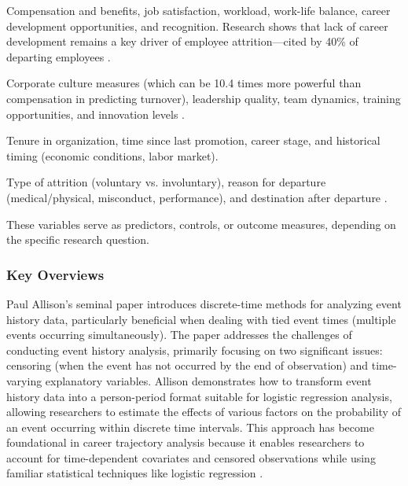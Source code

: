 \documentclass[../main.tex]{subfiles}
\begin{document}
Compensation and benefits, job satisfaction, workload, work-life balance, career development opportunities, and recognition. Research shows that lack of career development remains a key driver of employee attrition—cited by 40\% of departing employees \citep{gartner2023career}.

Corporate culture measures (which can be 10.4 times more powerful than compensation in predicting turnover), leadership quality, team dynamics, training opportunities, and innovation levels \citep{sull2022toxic}.

Tenure in organization, time since last promotion, career stage, and historical timing (economic conditions, labor market).

Type of attrition (voluntary vs. involuntary), reason for departure (medical/physical, misconduct, performance), and destination after departure \citep{niessen2016attrition}.

These variables serve as predictors, controls, or outcome measures, depending on the specific research question.

\subsubsection{Key Overviews}

Paul Allison's seminal paper introduces discrete-time methods for analyzing event history data, particularly beneficial when dealing with tied event times (multiple events occurring simultaneously). The paper addresses the challenges of conducting event history analysis, primarily focusing on two significant issues: censoring (when the event has not occurred by the end of observation) and time-varying explanatory variables. Allison demonstrates how to transform event history data into a person-period format suitable for logistic regression analysis, allowing researchers to estimate the effects of various factors on the probability of an event occurring within discrete time intervals. This approach has become foundational in career trajectory analysis because it enables researchers to account for time-dependent covariates and censored observations while using familiar statistical techniques like logistic regression \citep{allison1982discrete}.
\end{document}
